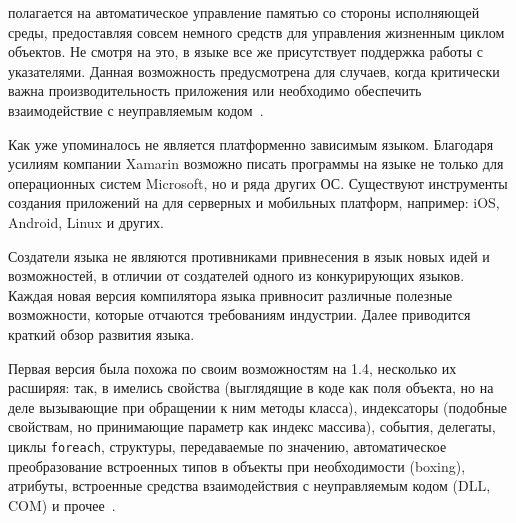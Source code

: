 \csharp{} полагается на автоматическое управление памятью со стороны исполняющей среды, предоставляя совсем немного средств для управления жизненным циклом объектов.
Не смотря на это, в языке все же присутствует поддержка работы с указателями.
Данная возможность предусмотрена для случаев, когда критически важна производительность приложения или необходимо обеспечить взаимодействие с неуправляемым кодом~\cite{albahari_2012_en}. 

Как уже упоминалось \csharp{} не является платформенно зависимым языком.
Благодаря усилиям компании Xamarin возможно писать программы на языке \csharp{} не только для операционных систем Microsoft, но и ряда других ОС.
Существуют инструменты создания приложений на \csharp{} для серверных и мобильных платформ, например: iOS, Android, Linux и других.

Создатели языка \csharp{} не являются противниками привнесения в язык новых идей и возможностей, в отличии от создателей одного из конкурирующих языков.
Каждая новая версия компилятора языка привносит различные полезные возможности, которые отчаются требованиям индустрии. 
Далее приводится краткий обзор развития языка.

Первая версия \csharp{} была похожа по своим возможностям на \java{} 1.4, несколько их расширяя: так, в \csharp{} имелись свойства (выглядящие в коде как поля объекта, но на деле вызывающие при обращении к ним методы класса), индексаторы (подобные свойствам, но принимающие параметр как индекс массива), события, делегаты, циклы \lstinline!foreach!, структуры, передаваемые по значению, автоматическое преобразование встроенных типов в объекты при необходимости (boxing), атрибуты, встроенные средства взаимодействия с неуправляемым кодом (DLL, COM) и прочее~\cite{csharp_wiki_2013_ru}. 

